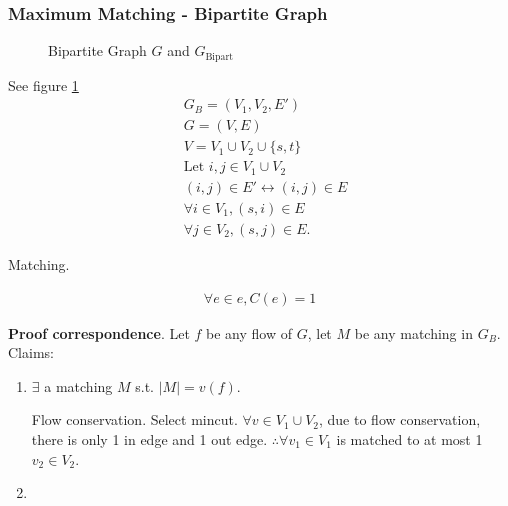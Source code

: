 \documentclass[a4paper]{report}
\theoremstyle{definition}
\begin{document}
\subsubsection{Maximum Matching - Bipartite Graph}
\begin{figure}[!htp]
\centering
{}
\caption{Bipartite Graph $G$ and $G_\text{Bipart}$}
\label{fig:bipart}
\end{figure}
See figure \ref{fig:bipart}
\begin{align*}
& G_B = (V_1, V_2, E') \\
& G=(V, E) \\
& V= V_1 \cup V_2\cup \{s, t\}\\
& \text{Let } i, j \in V_1 \cup V_2\\
& (i,j)\in E' \leftrightarrow (i, j)\in E\\
& \forall i \in V_1, (s, i) \in E \\
& \forall j \in V_2, (s, j) \in E. 
\end{align*}

Matching. 

\begin{align*}
\forall e \in e, C(e) =1
\end{align*}

\textbf{Proof correspondence}. Let $f$ be any flow of $G$, let $M$ be any matching in $G_B$. Claims:
\begin{enumerate}
\item $\exists$ a matching $M$ s.t. $|M|=v(f)$.

Flow conservation. Select mincut. $\forall v \in V_1\cup V_2$, due to flow conservation, there is only 1 in edge and 1 out edge. $\therefore \forall v_1 \in V_1$ is matched to at most 1 $v_2 \in V_2. $
\item 
\end{enumerate}
\end{document}
